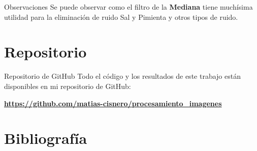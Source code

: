 \documentclass{beamer}
\begin{document}
\begin{frame}{Observaciones}
	\justifying
	Se puede observar como el filtro de la \textcolor{unahurverde}{\textbf{Mediana}} tiene muchísima utilidad para la eliminación de ruido Sal y Pimienta y otros tipos de ruido.
\end{frame}

\section{Repositorio}

\begin{frame}{Repositorio de GitHub}
	\justifying
	Todo el código y los resultados de este trabajo están disponibles en mi repositorio de GitHub: 
	
	\vspace{0.5cm}
	\centering
	\href{https://github.com/matias-cisnero/procesamiento_imagenes}{\textcolor{unahurverde}{\textbf{https://github.com/matias-cisnero/procesamiento\_imagenes}}}
\end{frame}

\section{Bibliografía}
	
\end{document}
